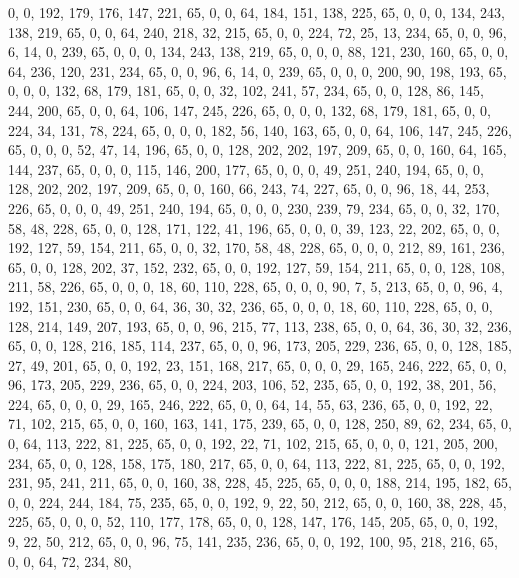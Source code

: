 \begin{DoxyCode}
       0, 0, 192, 179, 176, 147, 221, 65, 0, 0, 64, 184, 151, 138, 225, 65, 0, 0, 0, 134, 243, 138, 219, 65, 0, 0,
       64, 240, 218, 32, 215, 65, 0, 0, 224, 72, 25, 13, 234, 65, 0, 0, 96, 6, 14, 0, 239, 65, 0, 0, 0, 134, 243,
       138, 219, 65, 0, 0, 0, 88, 121, 230, 160, 65, 0, 0, 64, 236, 120, 231, 234, 65, 0, 0, 96, 6, 14, 0, 239, 65,
       0, 0, 0, 200, 90, 198, 193, 65, 0, 0, 0, 132, 68, 179, 181, 65, 0, 0, 32, 102, 241, 57, 234, 65, 0, 0, 128,
       86, 145, 244, 200, 65, 0, 0, 64, 106, 147, 245, 226, 65, 0, 0, 0, 132, 68, 179, 181, 65, 0, 0, 224, 34, 131,
       78, 224, 65, 0, 0, 0, 182, 56, 140, 163, 65, 0, 0, 64, 106, 147, 245, 226, 65, 0, 0, 0, 52, 47, 14, 196, 65,
       0, 0, 128, 202, 202, 197, 209, 65, 0, 0, 160, 64, 165, 144, 237, 65, 0, 0, 0, 115, 146, 200, 177, 65, 0, 0,
       0, 49, 251, 240, 194, 65, 0, 0, 128, 202, 202, 197, 209, 65, 0, 0, 160, 66, 243, 74, 227, 65, 0, 0, 96, 18,
       44, 253, 226, 65, 0, 0, 0, 49, 251, 240, 194, 65, 0, 0, 0, 230, 239, 79, 234, 65, 0, 0, 32, 170, 58, 48,
       228, 65, 0, 0, 128, 171, 122, 41, 196, 65, 0, 0, 0, 39, 123, 22, 202, 65, 0, 0, 192, 127, 59, 154, 211, 65, 0,
       0, 32, 170, 58, 48, 228, 65, 0, 0, 0, 212, 89, 161, 236, 65, 0, 0, 128, 202, 37, 152, 232, 65, 0, 0, 192,
       127, 59, 154, 211, 65, 0, 0, 128, 108, 211, 58, 226, 65, 0, 0, 0, 18, 60, 110, 228, 65, 0, 0, 0, 90, 7, 5,
       213, 65, 0, 0, 96, 4, 192, 151, 230, 65, 0, 0, 64, 36, 30, 32, 236, 65, 0, 0, 0, 18, 60, 110, 228, 65, 0, 0,
       128, 214, 149, 207, 193, 65, 0, 0, 96, 215, 77, 113, 238, 65, 0, 0, 64, 36, 30, 32, 236, 65, 0, 0, 128, 216,
       185, 114, 237, 65, 0, 0, 96, 173, 205, 229, 236, 65, 0, 0, 128, 185, 27, 49, 201, 65, 0, 0, 192, 23, 151,
       168, 217, 65, 0, 0, 0, 29, 165, 246, 222, 65, 0, 0, 96, 173, 205, 229, 236, 65, 0, 0, 224, 203, 106, 52, 235,
       65, 0, 0, 192, 38, 201, 56, 224, 65, 0, 0, 0, 29, 165, 246, 222, 65, 0, 0, 64, 14, 55, 63, 236, 65, 0, 0,
       192, 22, 71, 102, 215, 65, 0, 0, 160, 163, 141, 175, 239, 65, 0, 0, 128, 250, 89, 62, 234, 65, 0, 0, 64, 113,
       222, 81, 225, 65, 0, 0, 192, 22, 71, 102, 215, 65, 0, 0, 0, 121, 205, 200, 234, 65, 0, 0, 128, 158, 175,
       180, 217, 65, 0, 0, 64, 113, 222, 81, 225, 65, 0, 0, 192, 231, 95, 241, 211, 65, 0, 0, 160, 38, 228, 45, 225,
       65, 0, 0, 0, 188, 214, 195, 182, 65, 0, 0, 224, 244, 184, 75, 235, 65, 0, 0, 192, 9, 22, 50, 212, 65, 0, 0,
       160, 38, 228, 45, 225, 65, 0, 0, 0, 52, 110, 177, 178, 65, 0, 0, 128, 147, 176, 145, 205, 65, 0, 0, 192, 9,
       22, 50, 212, 65, 0, 0, 96, 75, 141, 235, 236, 65, 0, 0, 192, 100, 95, 218, 216, 65, 0, 0, 64, 72, 234, 80,

\end{DoxyCode}
